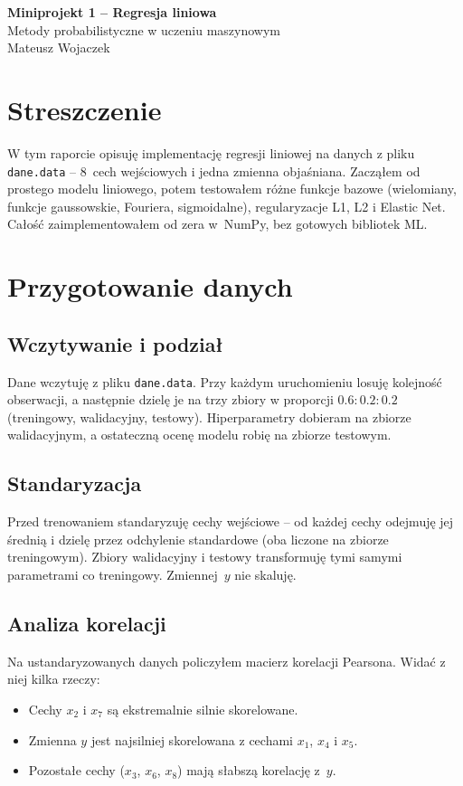 \documentclass[11pt,a4paper]{article}
\begin{document}
\begin{center}
{\Large\textbf{Miniprojekt 1 -- Regresja liniowa}}\\[0.3em]
{\large Metody probabilistyczne w uczeniu maszynowym}\\[0.3em]
Mateusz Wojaczek
\end{center}

\section*{Streszczenie}

W tym raporcie opisuję implementację regresji liniowej na danych z pliku \texttt{dane.data} -- 8~cech wejściowych i jedna zmienna objaśniana. Zacząłem od prostego modelu liniowego, potem testowałem różne funkcje bazowe (wielomiany, funkcje gaussowskie, Fouriera, sigmoidalne), regularyzacje L1, L2 i Elastic Net. Całość zaimplementowałem od zera w~NumPy, bez gotowych bibliotek ML.

\section{Przygotowanie danych}

\subsection{Wczytywanie i podział}

Dane wczytuję z pliku \texttt{dane.data}. Przy każdym uruchomieniu losuję kolejność obserwacji, a następnie dzielę je na trzy zbiory w proporcji $0.6 : 0.2 : 0.2$ (treningowy, walidacyjny, testowy). Hiperparametry dobieram na zbiorze walidacyjnym, a ostateczną ocenę modelu robię na zbiorze testowym.

\subsection{Standaryzacja}

Przed trenowaniem standaryzuję cechy wejściowe -- od każdej cechy odejmuję jej średnią i dzielę przez odchylenie standardowe (oba liczone na zbiorze treningowym). Zbiory walidacyjny i testowy transformuję tymi samymi parametrami co treningowy. Zmiennej~$y$ nie skaluję.


\subsection{Analiza korelacji}

Na ustandaryzowanych danych policzyłem macierz korelacji Pearsona. Widać z niej kilka rzeczy:
\begin{itemize}
    \item Cechy $x_2$ i $x_7$ są ekstremalnie silnie skorelowane.
    \item Zmienna $y$ jest najsilniej skorelowana z cechami $x_1$, $x_4$ i $x_5$.
    \item Pozostałe cechy ($x_3$, $x_6$, $x_8$) mają słabszą korelację z~$y$.
\end{itemize}
\end{document}
